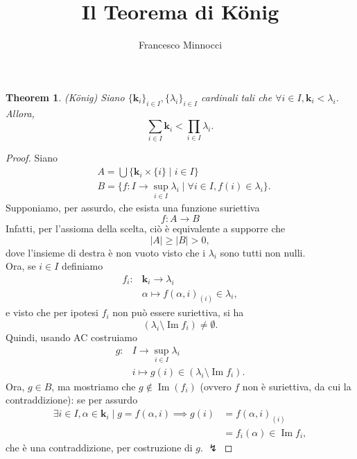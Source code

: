 \documentclass[a4paper]{article}
\renewcommand{\Im}{\operatorname{Im}}
\newtheorem{theorem}{Theorem}
\begin{document}
\title{Il Teorema di König}
\author{Francesco Minnocci}
\maketitle
\begin{theorem}(König)
Siano \(\{\mathbf{k}_i\}_{i \in I}, \{\lambda_i\}_{i \in I}\) cardinali tali che \(\forall i \in I, \mathbf{k}_i < \lambda_i\). Allora, \[ \sum_{i \in I}{\mathbf{k}_i} <\prod_{i \in I}{\lambda_i} .\]
\end{theorem}
\begin{proof}
	Siano
\begin{align*}
	&A= \bigcup{\{\mathbf{k}_i\times\{i\}\mid i\in I\}}\\
	&B=\{f\colon I\rightarrow \sup_{i\in I}{\lambda_i}\mid \forall i\in I, f{(i)}\in \lambda_i\} .
\end{align*}
	Supponiamo, per assurdo, che esista una funzione suriettiva \[ f\colon A \longrightarrow B \]
	Infatti, per l'assioma della scelta, ciò è equivalente a supporre che
	\[ |A|\geq|B|>0 ,\]
	dove l'insieme di destra è non vuoto visto che i \(\lambda_i\) sono tutti non nulli.\\
Ora, se \(i \in I\) definiamo
\begin{align*}
	f_i\colon &\mathbf{k}_i\longrightarrow\lambda_i\\
	     &\alpha\longmapsto f{\left( \alpha,i \right) }_{(i)}\in\lambda_i,
\end{align*}
e visto che per ipotesi \(f_i\) non può essere suriettiva, si ha \[(\lambda_i\setminus\Im{f_i})\neq\emptyset.\]
Quindi, usando AC costruiamo
\begin{align*}
	g\colon&I\longrightarrow\sup_{i\in I}{\lambda_i}\\
	&i\longmapsto g{(i)}\in\left( \lambda_i\setminus\Im{f_i} \right)
.\end{align*}
Ora, \(g\in B\), ma mostriamo che \(g\notin\Im{(f_i)}\) (ovvero \(f\) non è suriettiva, da cui la contraddizione): se per assurdo
\begin{align*}
	\exists i\in I, \alpha\in\mathbf{k}_i\mid g=f{(\alpha,i)} \implies g{(i)}&=f{(\alpha,i)}_{(i)}\\
										 &=f_i{(\alpha)}\in\Im{f_i},
\end{align*}
che è una contraddizione, per costruzione di \(g\). \(\lightning\)
\end{proof}
\end{document}
